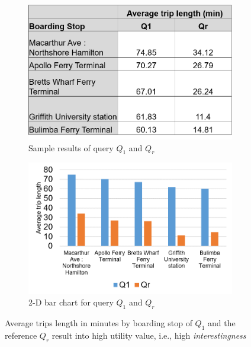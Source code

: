 \begin{figure}[t]
  \begin{subfigure}[b]{0.45\textwidth}
    \includegraphics[width=\textwidth]{table_gocard_ex.png}
    \caption{Sample results of query $Q_1$ and $Q_r$}
       \label{fig:table_gocard_ex}
  \end{subfigure}
	\begin{subfigure}[b]{0.45\textwidth}
    \includegraphics[width=\textwidth]{chart_gocard_ex.png}
    \caption{2-D bar chart for query $Q_1$ and $Q_r$}
       \label{fig:chart_gocard_ex}
  \end{subfigure}
  \caption{Average trips length in minutes by boarding stop of $Q_1$ and the reference $Q_r$ result into high utility value, i.e., high \emph{interestingness}}
\end{figure}
%
